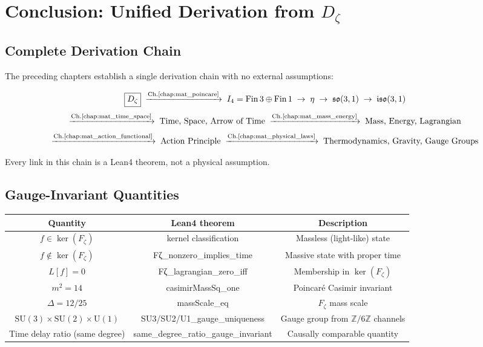 \chapter{Conclusion: Unified Derivation from \texorpdfstring{$D_\zeta$}{Dζ}}
\label{chap:mat_conclusion}

\section{Complete Derivation Chain}
\label{sec:mat_derivation_chain}

The preceding chapters establish a single derivation chain with no external assumptions:

\[
\boxed{D_\zeta} \;\xrightarrow{\text{Ch.\ref{chap:mat_poincare}}}\; I_4 = \mathrm{Fin}\,3 \oplus \mathrm{Fin}\,1 \;\to\; \eta \;\to\; \mathfrak{so}(3,1) \;\to\; \mathfrak{iso}(3,1)
\]
\[
\xrightarrow{\text{Ch.\ref{chap:mat_time_space}}}\; \text{Time, Space, Arrow of Time} \;\xrightarrow{\text{Ch.\ref{chap:mat_mass_energy}}}\; \text{Mass, Energy, Lagrangian}
\]
\[
\xrightarrow{\text{Ch.\ref{chap:mat_action_functional}}}\; \text{Action Principle} \;\xrightarrow{\text{Ch.\ref{chap:mat_physical_laws}}}\; \text{Thermodynamics, Gravity, Gauge Groups}
\]

Every link in this chain is a Lean4 theorem, not a physical assumption.

\section{Gauge-Invariant Quantities}
\label{sec:mat_gauge_invariant}

\begin{center}
\begin{tabular}{|c|c|c|}
\hline
Quantity & Lean4 theorem & Description \\
\hline
$f \in \ker(F_\zeta)$ & kernel classification & Massless (light-like) state \\
$f \notin \ker(F_\zeta)$ & Fζ\_nonzero\_implies\_time & Massive state with proper time \\
$L[f] = 0$ & Fζ\_lagrangian\_zero\_iff & Membership in $\ker(F_\zeta)$ \\
$m^2 = 14$ & casimirMassSq\_one & Poincar\'{e} Casimir invariant \\
$\Delta = 12/25$ & massScale\_eq & $F_\zeta$ mass scale \\
$\mathrm{SU}(3) \times \mathrm{SU}(2) \times \mathrm{U}(1)$ & SU3/SU2/U1\_gauge\_uniqueness & Gauge group from $\mathbb{Z}/6\mathbb{Z}$ channels \\
Time delay ratio (same degree) & same\_degree\_ratio\_gauge\_invariant & Causally comparable quantity \\
\hline
\end{tabular}
\end{center}

